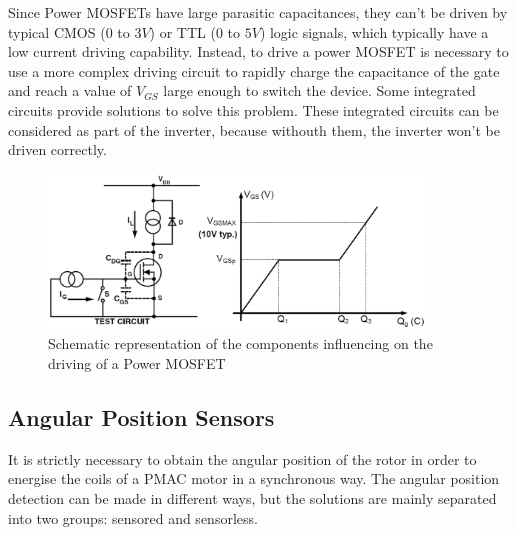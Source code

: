 Since Power \ac{MOSFET}s have large parasitic capacitances, they can't be driven by typical CMOS ($0$ to $3V$) or TTL ($0$ to $5V$) logic signals, which typically have a low current driving capability. Instead, to drive a power \ac{MOSFET} is necessary to use a more complex driving circuit to rapidly charge the capacitance of the gate and reach a value of $V_{GS}$ large enough to switch the device. Some integrated circuits provide solutions to solve this problem. These integrated circuits can be considered as part of the inverter, because withouth them, the inverter won't be driven correctly.

\begin{figure}[htbp]
\centering
\includegraphics[width=10cm]{Images/mosfet_drive.png} 
\caption[MOSFET Driving Diagram]{Schematic representation of the components influencing on the driving of a Power MOSFET}
\label{fig:mosfet_drive}
\end{figure}

\subsection{Angular Position Sensors} \label{subsection:angular_sensors}

It is strictly necessary to obtain the angular position of the rotor in order to energise the coils of a \ac{PMAC} motor in a synchronous way. The angular position detection can be made in different ways, but the solutions are mainly separated into two groups: sensored and sensorless.

